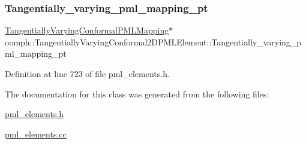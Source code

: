 \subsubsection{\texorpdfstring{Tangentially\+\_\+varying\+\_\+pml\+\_\+mapping\+\_\+pt}{Tangentially\_varying\_pml\_mapping\_pt}}
{\footnotesize\ttfamily \hyperlink{classoomph_1_1TangentiallyVaryingConformalPMLMapping}{Tangentially\+Varying\+Conformal\+P\+M\+L\+Mapping}$\ast$ oomph\+::\+Tangentially\+Varying\+Conformal2\+D\+P\+M\+L\+Element\+::\+Tangentially\+\_\+varying\+\_\+pml\+\_\+mapping\+\_\+pt\hspace{0.3cm}{\ttfamily [protected]}}



Definition at line 723 of file pml\+\_\+elements.\+h.



The documentation for this class was generated from the following files\+:\begin{DoxyCompactItemize}
\item 
\hyperlink{pml__elements_8h}{pml\+\_\+elements.\+h}\item 
\hyperlink{pml__elements_8cc}{pml\+\_\+elements.\+cc}\end{DoxyCompactItemize}
